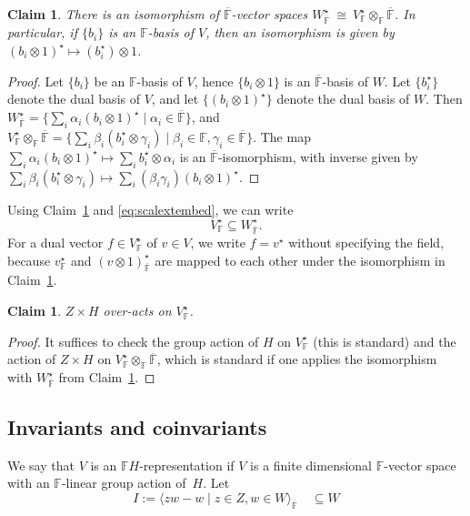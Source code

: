 \documentclass[a4paper]{extarticle}
\newcommand{\IF}{\mathbb{F}}
\newcommand{\oIF}{{\overline{\mathbb{F}}}}
\numberwithin{theorem}{section}
\newtheorem{claim}[theorem]{Claim}
\theoremstyle{definition}
\begin{document}
\begin{claim}\label{cla:dualscalarextension}
There is an isomorphism of $\oIF$-vector spaces
$W^\star_{\oIF} \ \cong \ V^\star_\IF \otimes_\IF \oIF$.
In particular, if $\{b_i\}$ is an $\IF$-basis of $V$, then an isomorphism is given by $(b_i\otimes 1)^\star\mapsto (b_i^\star)\otimes 1$.
\end{claim}
\begin{proof}
Let $\{b_i\}$ be an $\IF$-basis of $V$, hence $\{b_i\otimes 1\}$ is an $\oIF$-basis of $W$.
Let $\{b_i^\star\}$ denote the dual basis of $V$, and let $\{(b_i\otimes 1)^\star\}$ denote the dual basis of $W$.
Then $W^\star_\oIF = \{\sum_{i}\alpha_i(b_i\otimes 1)^\star\mid \alpha_i\in\oIF\}$,
and $V^\star_\IF \otimes_\IF \oIF = \{\sum_{i}\beta_i (b_i^\star \otimes \gamma_i) \mid \beta_i\in\IF, \gamma_i\in\oIF\}$.
The map $\sum_{i}\alpha_i(b_i\otimes 1)^\star\mapsto\sum_{i}b_i^\star \otimes \alpha_i$
is an $\oIF$-isomorphism, with inverse given by
$\sum_{i}\beta_i (b_i^\star \otimes \gamma_i)\mapsto\sum_{i}(\beta_i\gamma_i)(b_i\otimes 1)^\star$.
\end{proof}
Using Claim~\ref{cla:dualscalarextension} and \eqref{eq:scalextembed}, we can write
\begin{equation}\label{eq:VstarWstar}
V^\star_\IF\subseteq W^\star_\oIF.
\end{equation}
For a dual vector $f\in V^\star_\IF$ of $v\in V$, we write $f=v^\star$ without specifying the field,
because $v^\star_\IF$ and $(v\otimes 1)^\star_\oIF$ are mapped to each other under the isomorphism in Claim~\ref{cla:dualscalarextension}.


\begin{claim}\label{cla:semiactdual}
$Z \times H$ over-acts on $V^\star_\IF$.
\end{claim}
\begin{proof}
It suffices to check the group action of $H$ on $V^\star_{\IF}$ (this is standard) and the action of $Z\times H$ on $V^\star_\IF\otimes_\IF\oIF$,
which is standard if one applies the isomorphism with $W^\star_{\oIF}$ from Claim~\ref{cla:dualscalarextension}.
\end{proof}


\subsection{Invariants and coinvariants}

We say that $V$ is an $\IF H$-representation if $V$ is a finite dimensional $\IF$-vector space with an $\IF$-linear group action of~$H$.
Let
\[
I := \langle zw-w\mid z\in Z, w\in W\rangle_\oIF \quad \subseteq W
\]
\end{document}
